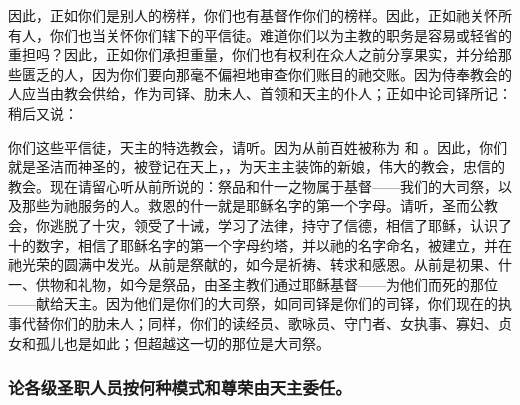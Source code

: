 因此，正如你们是别人的榜样，你们也有基督作你们的榜样。因此，正如祂关怀所有人，你们也当关怀你们辖下的平信徒。难道你们以为主教的职务是容易或轻省的重担吗？因此，正如你们承担重量，你们也有权利在众人之前分享果实，并分给那些匮乏的人，因为你们要向那毫不偏袒地审查你们账目的祂交账。因为侍奉教会的人应当由教会供给，作为司铎、肋未人、首领和天主的仆人；正如中论司铎所记：   稍后又说：\par

你们这些平信徒，天主的特选教会，请听。因为从前百姓被称为 和 。因此，你们就是圣洁而神圣的，被登记在天上，，为天主主装饰的新娘，伟大的教会，忠信的教会。现在请留心听从前所说的：祭品和什一之物属于基督——我们的大司祭，以及那些为祂服务的人。救恩的什一就是耶稣名字的第一个字母。请听，圣而公教会，你逃脱了十灾，领受了十诫，学习了法律，持守了信德，相信了耶稣，认识了十的数字，相信了耶稣名字的第一个字母约塔，并以祂的名字命名，被建立，并在祂光荣的圆满中发光。从前是祭献的，如今是祈祷、转求和感恩。从前是初果、什一、供物和礼物，如今是祭品，由圣主教们通过耶稣基督——为他们而死的那位——献给天主。因为他们是你们的大司祭，如同司铎是你们的司铎，你们现在的执事代替你们的肋未人；同样，你们的读经员、歌咏员、守门者、女执事、寡妇、贞女和孤儿也是如此；但超越这一切的那位是大司祭。\par


\subsubsection{论各级圣职人员按何种模式和尊荣由天主委任。}

